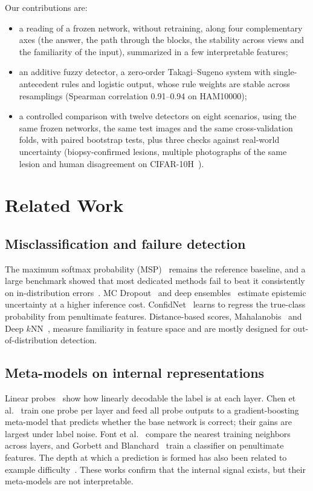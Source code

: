 \documentclass[conference,a4paper]{IEEEtran}
\begin{document}
Our contributions are:
\begin{itemize}
  \item a reading of a frozen network, without retraining, along four complementary axes (the answer, the path through the blocks,
        the stability across views and the familiarity of the input), summarized in a few interpretable features;
  \item an additive fuzzy detector, a zero-order Takagi--Sugeno system with single-antecedent rules and logistic output, whose rule
        weights are stable across resamplings (Spearman correlation 0.91--0.94 on HAM10000);
  \item a controlled comparison with twelve detectors on eight scenarios, using the same frozen networks, the same test images and the
        same cross-validation folds, with paired bootstrap tests, plus three checks against real-world uncertainty
        (biopsy-confirmed lesions, multiple photographs of the same lesion and human disagreement on CIFAR-10H~\cite{peterson2019}).
\end{itemize}

\section{Related Work}

\subsection{Misclassification and failure detection}
The maximum softmax probability (MSP)~\cite{hendrycks2017} remains the reference baseline, and a large benchmark showed that most
dedicated methods fail to beat it consistently on in-distribution errors~\cite{jaeger2023}. MC Dropout~\cite{gal2016} and deep
ensembles~\cite{lakshminarayanan2017} estimate epistemic uncertainty at a higher inference cost. ConfidNet~\cite{corbiere2019}
learns to regress the true-class probability from penultimate features. Distance-based scores, Mahalanobis~\cite{lee2018} and Deep
$k$NN~\cite{papernot2018}, measure familiarity in feature space and are mostly designed for out-of-distribution detection.

\subsection{Meta-models on internal representations}
Linear probes~\cite{alain2016} show how linearly decodable the label is at each layer. Chen et al.~\cite{chen2019} train one probe per
layer and feed all probe outputs to a gradient-boosting meta-model that predicts whether the base network is correct; their gains are
largest under label noise. Font et al.~\cite{font2025} compare the nearest training neighbors across layers, and Gorbett and
Blanchard~\cite{gorbett2022} train a classifier on penultimate features. The depth at which a prediction is formed has also been related
to example difficulty~\cite{baldock2021}. These works confirm that the internal signal exists, but their meta-models are not interpretable.
\end{document}
